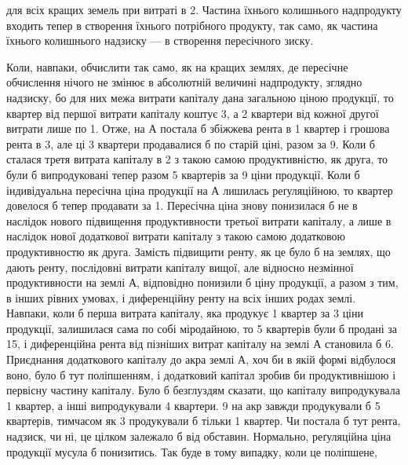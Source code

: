 \parcont{}  %
для всіх кращих земель при витраті в 2. Частина їхнього колишнього
надпродукту входить тепер в створення їхнього потрібного продукту, так
само, як частина їхнього колишнього надзиску — в створення пересічного зиску.

Коли, навпаки, обчислити так само, як на кращих землях, де пересічне обчислення
нічого не змінює в абсолютній величині надпродукту, зглядно надзиску, бо для
них межа витрати капіталу дана загальною ціною продукції, то квартер від першої
витрати капіталу коштує 3, а 2 квартери від кожної другої витрати
лише по 1. Отже, на $А$ постала б збіжжева рента в 1 квартер
і грошова рента в 3, але ці 3 квартери продавалися б по старій
ціні, разом за 9. Коли б сталася третя витрата капіталу в 2 з такою самою продуктивністю, як друга, то були б випродуковані тепер
разом 5 квартерів за 9 ціни продукції. Коли б індивідуальна
пересічна ціна продукції на $А$ лишилась реґуляційною, то квартер довелося б
тепер продавати за 1. Пересічна ціна знову понизилася б не в
наслідок нового підвищення продуктивности третьої витрати капіталу, а лише в
наслідок нової додаткової витрати капіталу з такою самою додатковою продуктивностю
як друга. Замість підвищити ренту, як це було б на землях, що дають
ренту, послідовні витрати капіталу вищої, але відносно незмінної продуктивности
на землі $А$, відповідно понизили б ціну продукції, а разом з тим, в інших
рівних умовах, і диференційну ренту на всіх інших родах землі. Навпаки,
коли б перша витрата капіталу, яка продукує 1 квартер за 3 ціни
продукції, залишилася сама по собі міродайною, то 5 квартерів були б продані
за 15, і диференційна рента від пізніших витрат капіталу на землі
$А$ становила б 6. Приєднання додаткового капіталу до акра землі $А$,
хоч би в якій формі відбулося воно, було б тут поліпшенням, і додатковий
капітал зробив би продуктивнішою і первісну частину капіталу. Було б безглуздям
сказати, що   капіталу випродукувала 1 квартер, а інші  випродукували
4 квартери. 9 на акр завжди продукували б 5 квартерів, тимчасом
як 3 продукували б тільки 1 квартер. Чи постала б тут рента, надзиск,
чи ні, це цілком залежало б від обставин. Нормально, реґуляційна ціна
продукції мусула б понизитись. Так буде в тому випадку, коли це поліпшене,
